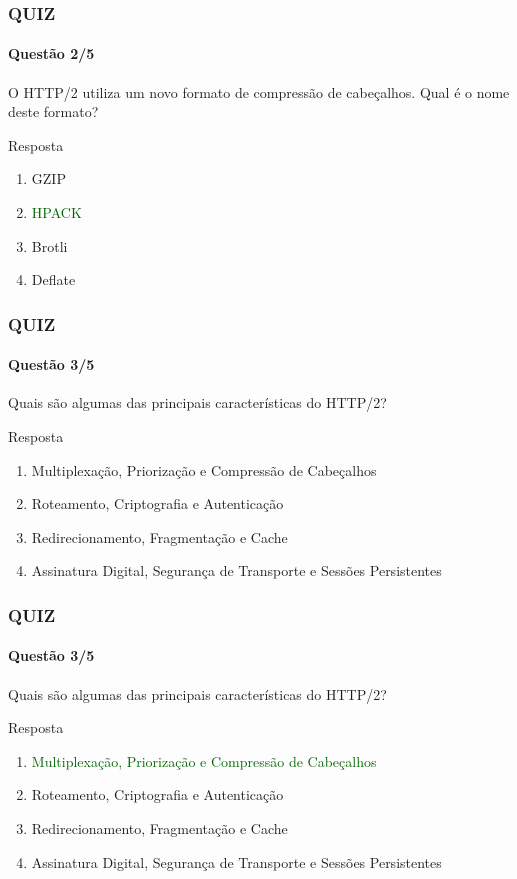 \documentclass[
	9pt, %
	t, %
]{beamer}
\begin{document}
\begin{frame}
	\frametitle{QUIZ}
	\framesubtitle{Questão 2/5}

	{\Large O HTTP/2 utiliza um novo formato de compressão de cabeçalhos. Qual é o nome deste formato? }

	\begin{exampleblock}{Resposta}
		\begin{enumerate}[a]
			\item GZIP
			\item \textcolor{darkgreen}{HPACK}
			\item Brotli
			\item Deflate
		\end{enumerate}
	\end{exampleblock}

\end{frame}


\begin{frame}
	\frametitle{QUIZ}
	\framesubtitle{Questão 3/5}

	{\Large Quais são algumas das principais características do HTTP/2?	}

	\begin{exampleblock}{Resposta}
		\begin{enumerate}[a]
			\item Multiplexação, Priorização e Compressão de Cabeçalhos
			\item Roteamento, Criptografia e Autenticação
			\item Redirecionamento, Fragmentação e Cache
			\item Assinatura Digital, Segurança de Transporte e Sessões Persistentes
		\end{enumerate}
	\end{exampleblock}

\end{frame}

\begin{frame}
	\frametitle{QUIZ}
	\framesubtitle{Questão 3/5}

	{\Large Quais são algumas das principais características do HTTP/2?	}

	\begin{exampleblock}{Resposta}
		\begin{enumerate}[a]
			\item \textcolor{darkgreen}{Multiplexação, Priorização e Compressão de Cabeçalhos}
			\item Roteamento, Criptografia e Autenticação
			\item Redirecionamento, Fragmentação e Cache
			\item Assinatura Digital, Segurança de Transporte e Sessões Persistentes
		\end{enumerate}
	\end{exampleblock}

\end{frame}
\end{document}
